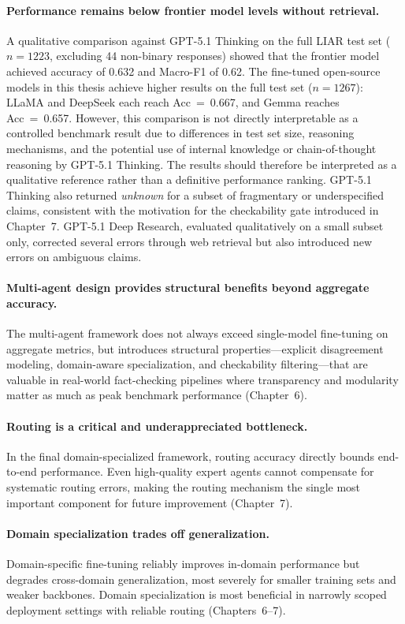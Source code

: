 \paragraph{Performance remains below frontier model levels without retrieval.}
A qualitative comparison against GPT-5.1 Thinking on the full LIAR test set ($n = 1223$, excluding 44 non-binary responses) showed that the frontier model achieved accuracy of 0.632 and Macro-F1 of 0.62. The fine-tuned open-source models in this thesis achieve higher results on the full test set ($n = 1267$): LLaMA and DeepSeek each reach Acc~=~0.667, and Gemma reaches Acc~=~0.657. However, this comparison is not directly interpretable as a controlled benchmark 
result due to differences in test set size, reasoning mechanisms, and the potential use of internal knowledge or chain-of-thought reasoning by GPT-5.1 Thinking. The results should therefore be interpreted as a qualitative reference rather than a definitive performance ranking. GPT-5.1 Thinking also returned \emph{unknown} for a subset of fragmentary or underspecified claims, consistent with the motivation for the checkability gate introduced in 
Chapter~7. GPT-5.1 Deep Research, evaluated qualitatively on a small subset only, corrected several errors through web retrieval but also introduced new errors on ambiguous claims.

\paragraph{Multi-agent design provides structural benefits beyond aggregate accuracy.}
The multi-agent framework does not always exceed single-model fine-tuning on aggregate metrics, but introduces structural properties---explicit disagreement modeling, domain-aware specialization, and checkability filtering---that are valuable in real-world fact-checking pipelines where transparency and modularity matter as much as peak benchmark performance (Chapter~6).

\paragraph{Routing is a critical and underappreciated bottleneck.}
In the final domain-specialized framework, routing accuracy directly bounds end-to-end performance. Even high-quality expert agents cannot compensate for systematic routing errors, making the routing mechanism the single most important component for future improvement (Chapter~7).

\paragraph{Domain specialization trades off generalization.}
Domain-specific fine-tuning reliably improves in-domain performance but degrades cross-domain generalization, most severely for smaller training sets and weaker backbones. Domain specialization is most beneficial in narrowly scoped deployment settings with reliable routing (Chapters~6--7).

